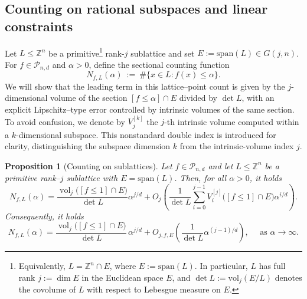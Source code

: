 \documentclass[11pt]{article}
\newtheorem{proposition}[theorem]{Proposition}
\theoremstyle{definition}
\numberwithin{equation}{section}
\newcommand{\Z}{\mathbb{Z}}
\newcommand{\cP}{\mathcal{P}}        %
\DeclareMathOperator{\vol}{vol}
\begin{document}
\subsection{Counting on rational subspaces and linear constraints}\label{subsec:sublattice}

Let $L \le \mathbb{Z}^n$ be a primitive\footnote{Equivalently, 
$L = \mathbb{Z}^n \cap E$, where $E := \mathrm{span}(L)$. 
In particular, $L$ has full rank $j := \dim E$ in the Euclidean space $E$, and 
$\det L := \mathrm{vol}_j(E/L)$ denotes the covolume of $L$ with respect to Lebesgue measure on $E$.} 
rank-$j$ sublattice and set $E := \mathrm{span}(L) \in G(j,n)$. 
For $f \in \mathcal{P}_{n,d}$ and $\alpha > 0$, define the sectional counting function
\[
  N_{f,L}(\alpha) ~:=~ \#\{x \in L : f(x) \le \alpha\}.
\]
We will show that the leading term in this lattice–point count is given by the $j$-dimensional volume of the section $[f \le \alpha] \cap E$ divided by $\det L$, with an explicit Lipschitz–type error controlled by intrinsic volumes of the same section.
To avoid confusion, we denote by $ V^{[k]}_j $ the $j$-th intrinsic volume computed within a $k$-dimensional subspace.
This nonstandard double index is introduced for clarity, distinguishing the subspace dimension $k$ from the intrinsic-volume index $j$.

\begin{proposition}[Counting on sublattices]\label{thm:sublattice}
Let $f\in\cP_{n,d}$ and let $L\le\Z^n$ be a primitive rank–$j$ sublattice with $E = \mathrm{span}(L)$. 
Then, for all $\alpha>0$, it holds
\begin{equation}\label{eq:sublattice-main}
  N_{f,L}(\alpha)
  = 
  \frac{\vol_j\big([f\le 1]\cap E\big)}{\det L} \alpha^{j/d}
  + O_j \left(
  \frac{1}{\det L} \sum_{i = 0}^{j - 1} V_{i}^{[j]} \big([f\le 1]\cap E\big) \alpha^{i/d}
  \right).
\end{equation}
Consequently, it holds 
\begin{equation}\label{eq:sublattice-equivalent}
  N_{f,L}(\alpha)
  = \frac{\vol_j\big([f\le 1]\cap E\big)}{\det L}\,\alpha^{j/d}
  + O_{j, f, E}\!\left(\frac{1}{\det L}\alpha^{(j - 1)/d} \right), \quad \text{ as $\alpha \to \infty$}.
\end{equation}
\end{proposition}
\end{document}
